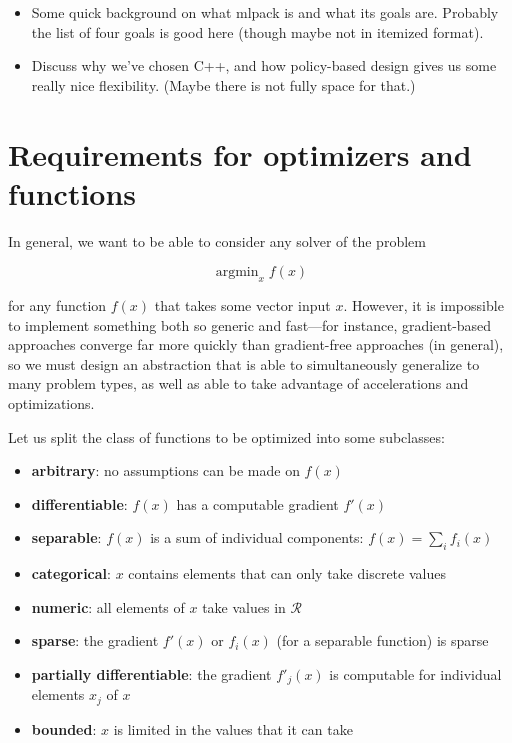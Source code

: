 \documentclass{article}
\begin{document}
\begin{itemize}
  \item Some quick background on what mlpack is and what its goals are.
Probably the list of four goals is good here (though maybe not in itemized
format).
  \item Discuss why we've chosen C++, and how policy-based design gives us some
really nice flexibility.  (Maybe there is not fully space for that.)
\end{itemize}

\section{Requirements for optimizers and functions}

In general, we want to be able to consider any solver of the problem

\begin{equation}
\operatorname{argmin}_{x} f(x)
\end{equation}

\noindent for any function $f(x)$ that takes some vector input $x$.  However, it
is impossible to implement something both so generic and fast---for instance,
gradient-based approaches converge far more quickly than gradient-free
approaches (in general), so we must design an abstraction that is able to
simultaneously generalize to many problem types, as well as able to take
advantage of accelerations and optimizations.

Let us split the class of functions to be optimized into some subclasses:

\begin{itemize}
  \item {\bf arbitrary}: no assumptions can be made on $f(x)$
  \item {\bf differentiable}: $f(x)$ has a computable gradient $f'(x)$
  \item {\bf separable}: $f(x)$ is a sum of individual components: $f(x) =
\sum_{i} f_i(x)$
  \item {\bf categorical}: $x$ contains elements that can only take discrete
values
  \item {\bf numeric}: all elements of $x$ take values in $\mathcal{R}$
  \item {\bf sparse}: the gradient $f'(x)$ or $f_i(x)$ (for a separable
function) is sparse
  \item {\bf partially differentiable}: the gradient $f'_j(x)$ is computable for
individual elements $x_j$ of $x$
  \item {\bf bounded}: $x$ is limited in the values that it can take
\end{itemize}
\end{document}

